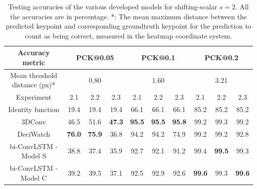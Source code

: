 \documentclass[./main.tex]{subfiles}
\begin{document}
\begin{table}[htbp]
    \begin{tabular}{c||ccc|ccc|ccc}
        \hline
        Accuracy metric & \multicolumn{3}{c}{PCK@0.05} & \multicolumn{3}{c}{PCK@0.1} & \multicolumn{3}{c}{PCK@0.2} \\
        \hline
        Mean threshold distance (px)* & \multicolumn{3}{c}{0.80} & \multicolumn{3}{c}{1.60} & \multicolumn{3}{c}{3.21} \\
        \hline
        Experiment & 2.1 & 2.2 & 2.3 & 2.1 & 2.2 & 2.3 & 2.1 & 2.2 & 2.3 \\
        \hline
        \hline
        Identity function & 19.4 & 19.4 & 19.4 & 66.1 & 66.1 & 66.1 & 85.2 & 85.2 & 85.2 \\
        3DConv & 46.5 & 51.6 & \textbf{47.3} & \textbf{95.5} & \textbf{95.5} & \textbf{95.8} & 99.2 & 99.3 & 99.2 \\
        DeciWatch & \textbf{76.0} & \textbf{75.9} & 36.8 & 94.2 & 94.2 & 74.9 & 99.2 & 99.2 & 92.8 \\
        bi-ConvLSTM - Model S & 38.8 & 37.4 & 35.9 & 92.7 & 92.1 & 91.2 & 99.4 & \textbf{99.5} & 99.3 \\
        bi-ConvLSTM - Model C & 39.2 & 39.5 & 37.1 & 92.5 & 92.9 & 92.6 & \textbf{99.6} & 99.3 & \textbf{99.6} \\
        \hline
    \end{tabular}
    \caption{Testing accuracies of the various developed models for shifting-scalar $s = 2$. All the accuracies are in percentage. *: The mean maximum distance between the predicted keypoint and corresponding groundtruth keypoint for the prediction to count as being correct, measured in the heatmap coordinate system.}
    \label{tab:finetune_test_accs_2}
\end{table}
\end{document}
